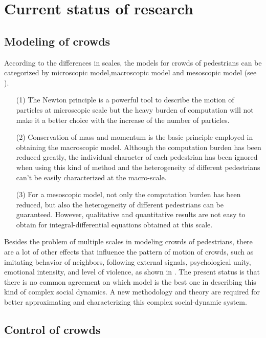 \documentclass[]{chencao}
\begin{document}
\section{Current status of research}

\subsection{Modeling of crowds}

According to the differences in scales, the models for crowds of
pedestrians can be categorized by microscopic model,macroscopic
model and mesoscopic model (see
\cite{1.Cristiani2011,1.Bellomo2012,1.DirkHelbing2005,1.Bellomo2011b,1.Dogbe2012a}).
%
\begin{enumerate}
\item[(1)] The Newton principle is a powerful tool to describe the motion of
particles at microscopic scale but the heavy burden of computation will
not make it a better choice with the increase of the number of
particles.
\item[(2)] Conservation of mass and momentum is the basic principle employed in
obtaining the macroscopic model. Although the computation burden has
been reduced greatly, the individual character of each pedestrian has
been ignored when using this kind of method and the heterogeneity of
different pedestrians can't be easily characterized at the macro-scale.
\item[(3)] For a mesoscopic model, not only the computation burden has been
reduced, but also the heterogeneity of different pedestrians can be
guaranteed. However, {qualitative and quantitative results are
not easy to obtain for integral-differential equations obtained at this
scale.}
\end{enumerate}
Besides the problem of multiple scales in modeling crowds of
pedestrians, {there are a lot of other effects that influence the
pattern of motion of crowds, such as imitating behavior of neighbors,
following external signals, psychological unity, emotional intensity,
and level of violence, as shown in \cite{1.Berlonghi1995}.} The present
status is that there is no common agreement on which model is the best
one in describing this kind of complex social dynamics. A new
methodology and theory are required for better approximating and
characterizing this complex social-dynamic system.

\subsection{Control of crowds}
\end{document}

